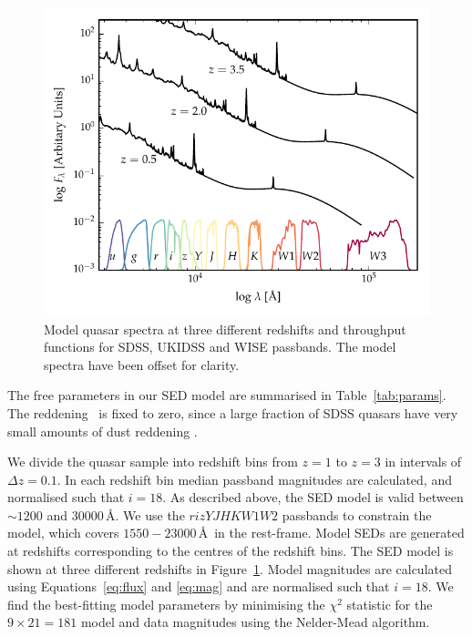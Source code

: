 \begin{figure}
  \centering
  \includegraphics[width=\textwidth]{figures/chapter05/throughput.pdf}
  \caption[{Model quasar spectrum at three different redshifts, and throughput functions for SDSS, UKIDSS and WISE passbands.}]{Model quasar spectra at three different redshifts and throughput functions for SDSS, UKIDSS and WISE passbands. The model spectra have been offset for clarity.}
  \label{fig:filters}
\end{figure}

The free parameters in our SED model are summarised in Table~\ref{tab:params}. 
The reddening \ebv\, is fixed to zero, since a large fraction of SDSS quasars have very small amounts of dust reddening \citep{richards03}. 

We divide the quasar sample into redshift bins from $z=1$ to $z=3$ in intervals of $\Delta z = 0.1$.
In each redshift bin median passband magnitudes are calculated, and normalised such that $i=18$.
As described above, the SED model is valid between $\sim1200$ and $30000$\,\AA.  
We use the $rizYJHKW1W2$ passbands to constrain the model, which covers $1550-23000$\,\AA\, in the rest-frame. 
Model SEDs are generated at redshifts corresponding to the centres of the redshift bins.
The SED model is shown at three different redshifts in Figure~\ref{fig:filters}.
Model magnitudes are calculated using Equations~\ref{eq:flux} and \ref{eq:mag} and are normalised such that $i=18$.
We find the best-fitting model parameters by minimising the $\chi^2$ statistic for the $9 \times 21 = 181$ model and data magnitudes using the Nelder-Mead algorithm. 

